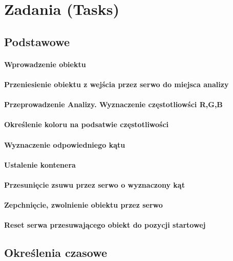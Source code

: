\documentclass[12pt]{article}
\begin{document}
\section{Zadania (Tasks)}
\subsection{Podstawowe}
\paragraph{Wprowadzenie obiektu}
\paragraph{Przeniesienie obiektu z wejścia przez serwo do miejsca analizy}
\paragraph{Przeprowadzenie Analizy. Wyznaczenie częstotliowści R,G,B}
\paragraph{Określenie koloru na podsatwie częstotliwości}
\paragraph{Wyznaczenie odpowiedniego kątu}
\paragraph{Ustalenie kontenera}
\paragraph{Przesunięcie zsuwu przez serwo o wyznaczony kąt}
\paragraph{Zepchnięcie, zwolnienie obiektu przez serwo}
\paragraph{Reset serwa przesuwającego obiekt do pozycji startowej}
\subsection{Określenia czasowe}
\end{document}
